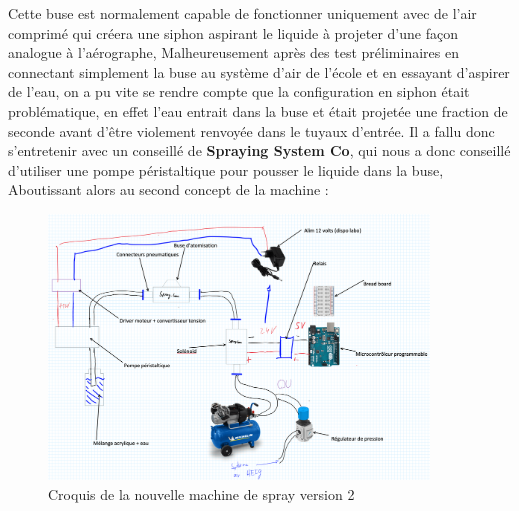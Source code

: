 Cette buse est normalement capable de fonctionner uniquement avec de l'air comprimé qui créera une siphon aspirant le liquide à projeter d'une façon analogue à l'aérographe,
Malheureusement après des test préliminaires en connectant simplement la buse au système d'air de l'école et en essayant d'aspirer de l'eau, on a pu vite se rendre compte que la
configuration en siphon était problématique, en effet l'eau entrait dans la buse et était projetée une fraction de seconde avant d'être violement renvoyée dans le tuyaux d'entrée.
Il a fallu donc s'entretenir avec un conseillé de \textbf{Spraying System Co}, qui nous a donc conseillé d'utiliser une pompe péristaltique pour pousser le liquide dans la buse,
Aboutissant alors au second concept de la machine :
\begin{figure}[H]
    \centering
    \includegraphics[width = 0.9\textwidth]{assets/figures/ameliorations/Croquis_machine_ecran_ver_2.png}
    \caption[Croquis nouvelle machine de spray ver. 2]{Croquis de la nouvelle machine de spray version 2}
\end{figure}

